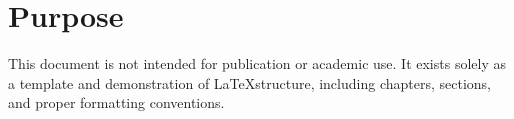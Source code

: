 \section{Purpose}
This document is not intended for publication or academic use. It exists solely as a template and demonstration of
\LaTeX structure, including chapters, sections, and proper formatting conventions.
